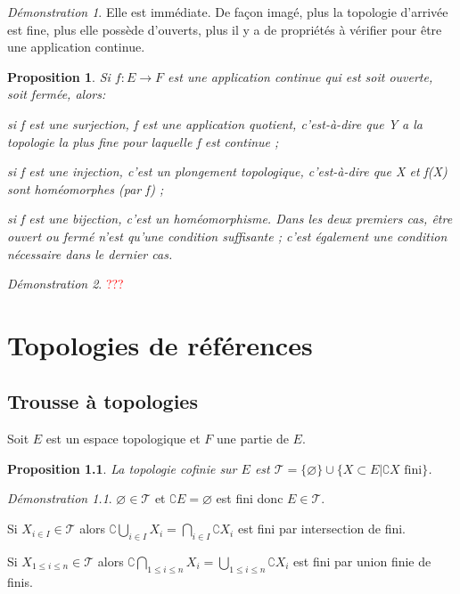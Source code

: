 \documentclass[a4paper, 11pt, french]{book}
\newenvironment{itemise}{\itemize}{\enditemize}
\theoremstyle{plain} %
\newtheorem{proposition}{Proposition}
\theoremstyle{definition} %
\theoremstyle{remark} %
\newtheorem*{demonstration}{Démonstration}
\newcommand{\1}{\mathds{1}}
\newcommand\vide{\varnothing}
\newcommand{\infegal}{\leqslant}
\begin{document}
\begin{demonstration}
	Elle est immédiate.
	De façon imagé, plus la topologie d'arrivée est fine, plus elle possède d'ouverts, plus il y a de propriétés à vérifier pour être une application continue.
\end{demonstration}

\begin{proposition}
	Si $f\colon E\rightarrow F$ est une application continue qui est soit ouverte, soit fermée, alors:
	\begin{itemise}
		\item si f est une surjection, f est une application quotient, c'est-à-dire que Y a la topologie la plus fine pour laquelle f est continue ;
		\item si f est une injection, c'est un plongement topologique, c'est-à-dire que X et f(X) sont homéomorphes (par f) ;
		\item si f est une bijection, c'est un homéomorphisme.
	\end{itemise}
	Dans les deux premiers cas, être ouvert ou fermé n'est qu'une condition suffisante ; c'est également une condition nécessaire dans le dernier cas.
\end{proposition}

\begin{demonstration}
	\textcolor{red}{???}
\end{demonstration}

\chapter{Topologies de références}

\section{Trousse à topologies}

Soit $E$ est un espace topologique et $F$ une partie de $E$.

\begin{proposition}
	La topologie cofinie sur $E$ est $\mathscr{T}=\{\vide\}\cup\{X\subset E|\complement X\text{ fini}\}$.
\end{proposition}

\begin{demonstration}
	\begin{itemise}
		\item $\vide\in\mathscr{T}$ et $\complement E=\vide$ est fini donc $E\in\mathscr{T}$.
		\item Si $X_{i\in I}\in\mathscr{T}$ alors $\complement\bigcup_{i\in I}X_i=\bigcap_{i\in I}\complement X_i$ est fini par intersection de fini.
		\item Si $X_{1\infegal i\infegal n}\in\mathscr{T}$ alors $\complement\bigcap_{1\infegal i\infegal n}X_i=\bigcup_{1\infegal i\infegal n}\complement X_i$ est fini par union finie de finis.
	\end{itemise}
\end{demonstration}
\end{document}
